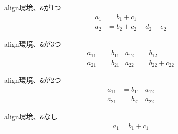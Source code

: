 \documentclass{tarticle}
\begin{document}

align環境、\verb+&+が1つ %
\begin{align}
a_1& =b_1+c_1\\
a_2& =b_2+c_2-d_2+e_2
\end{align}

align環境、\verb+&+が3つ %
\begin{align}
a_{11}& =b_{11}&
  a_{12}& =b_{12}\\
a_{21}& =b_{21}&
  a_{22}& =b_{22}+c_{22}
\end{align}

align環境、\verb+&+が2つ %
\begin{align}
a_{11}& =b_{11}&
  a_{12}\\
a_{21}& =b_{21}&
  a_{22}
\end{align}

align環境、\verb+&+なし %
\begin{align}
a_1=b_1+c_1
\end{align}
\end{document}
